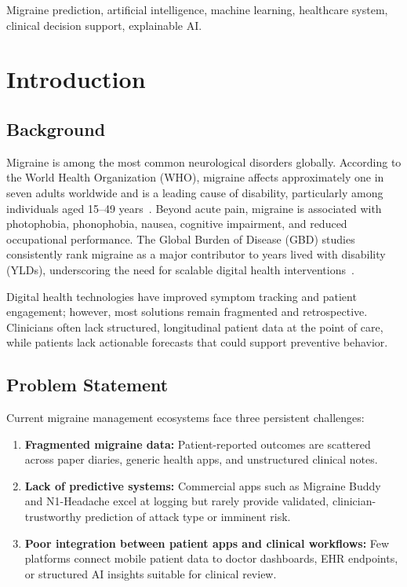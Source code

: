 \documentclass[conference,twocolumn,letterpaper]{IEEEtran}
\begin{document}
\begin{IEEEkeywords}
Migraine prediction, artificial intelligence, machine learning, healthcare system, clinical decision support, explainable AI.
\end{IEEEkeywords}

\section{Introduction}

\subsection{Background}
Migraine is among the most common neurological disorders globally. According to the World Health Organization (WHO), migraine affects approximately one in seven adults worldwide and is a leading cause of disability, particularly among individuals aged 15--49 years~\cite{who_headache}. Beyond acute pain, migraine is associated with photophobia, phonophobia, nausea, cognitive impairment, and reduced occupational performance. The Global Burden of Disease (GBD) studies consistently rank migraine as a major contributor to years lived with disability (YLDs), underscoring the need for scalable digital health interventions~\cite{gbd_neuro}.

Digital health technologies have improved symptom tracking and patient engagement; however, most solutions remain fragmented and retrospective. Clinicians often lack structured, longitudinal patient data at the point of care, while patients lack actionable forecasts that could support preventive behavior.

\subsection{Problem Statement}
Current migraine management ecosystems face three persistent challenges:
\begin{enumerate}
    \item \textbf{Fragmented migraine data:} Patient-reported outcomes are scattered across paper diaries, generic health apps, and unstructured clinical notes.
    \item \textbf{Lack of predictive systems:} Commercial apps such as Migraine Buddy and N1-Headache excel at logging but rarely provide validated, clinician-trustworthy prediction of attack type or imminent risk.
    \item \textbf{Poor integration between patient apps and clinical workflows:} Few platforms connect mobile patient data to doctor dashboards, EHR endpoints, or structured AI insights suitable for clinical review.
\end{enumerate}
\end{document}
